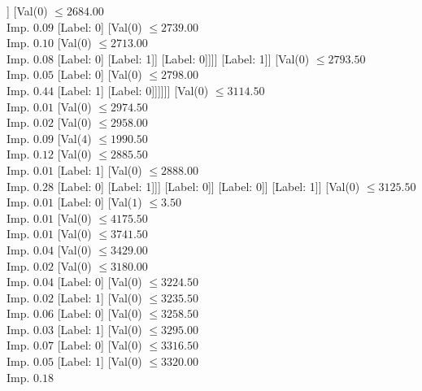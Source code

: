 \documentclass[margin=10pt]{standalone}
\begin{document}
\begin{forest}
													[Label: 1]]
												[Val($0$) $ \leq 2684.00$ \\ Imp. $0.09$
													[Label: 0]
													[Val($0$) $ \leq 2739.00$ \\ Imp. $0.10$
														[Val($0$) $ \leq 2713.00$ \\ Imp. $0.08$
															[Label: 0]
															[Label: 1]]
														[Label: 0]]]]
											[Label: 1]]
										[Val($0$) $ \leq 2793.50$ \\ Imp. $0.05$
											[Label: 0]
											[Val($0$) $ \leq 2798.00$ \\ Imp. $0.44$
												[Label: 1]
												[Label: 0]]]]]]
							[Val($0$) $ \leq 3114.50$ \\ Imp. $0.01$
								[Val($0$) $ \leq 2974.50$ \\ Imp. $0.02$
									[Val($0$) $ \leq 2958.00$ \\ Imp. $0.09$
										[Val($4$) $ \leq 1990.50$ \\ Imp. $0.12$
											[Val($0$) $ \leq 2885.50$ \\ Imp. $0.01$
												[Label: 1]
												[Val($0$) $ \leq 2888.00$ \\ Imp. $0.28$
													[Label: 0]
													[Label: 1]]]
											[Label: 0]]
										[Label: 0]]
									[Label: 1]]
								[Val($0$) $ \leq 3125.50$ \\ Imp. $0.01$
									[Label: 0]
									[Val($1$) $ \leq 3.50$ \\ Imp. $0.01$
										[Val($0$) $ \leq 4175.50$ \\ Imp. $0.01$
											[Val($0$) $ \leq 3741.50$ \\ Imp. $0.04$
												[Val($0$) $ \leq 3429.00$ \\ Imp. $0.02$
													[Val($0$) $ \leq 3180.00$ \\ Imp. $0.04$
														[Label: 0]
														[Val($0$) $ \leq 3224.50$ \\ Imp. $0.02$
															[Label: 1]
															[Val($0$) $ \leq 3235.50$ \\ Imp. $0.06$
																[Label: 0]
																[Val($0$) $ \leq 3258.50$ \\ Imp. $0.03$
																	[Label: 1]
																	[Val($0$) $ \leq 3295.00$ \\ Imp. $0.07$
																		[Label: 0]
																		[Val($0$) $ \leq 3316.50$ \\ Imp. $0.05$
																			[Label: 1]
																			[Val($0$) $ \leq 3320.00$ \\ Imp. $0.18$

\end{forest}
\end{document}
